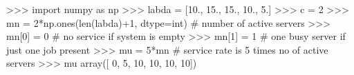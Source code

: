 
>>> import numpy as np
>>> labda = [10., 15., 15., 10., 5.]
>>> c = 2
>>> mn = 2*np.ones(len(labda)+1, dtype=int)  # number of active servers
>>> mn[0] = 0  # no service if system is empty
>>> mn[1] = 1  # one busy server if just one job present
>>> mu = 5*mn # service rate is 5 times no of active servers
>>> mu
array([ 0,  5, 10, 10, 10, 10])
